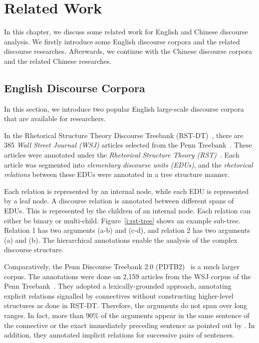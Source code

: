 %
%
%
\chapter{Related Work}
\label{c:related}

In this chapter, we discuss some related work for English and Chinese discourse
analysis. We firstly introduce some English discourse corpora and the
related discourse researches. Afterwards, we continue with the Chinese
discourse corpora and the related Chinese researches.

\section{English Discourse Corpora}

In this section, we introduce two popular English large-scale discourse
corpora that are available for researchers.

In the Rhetorical Structure Theory Discourse Treebank (RST-DT)~\citep{Carlson01building},
there are 385 \textit{Wall Street Journal (WSJ)} articles selected from
the Penn Treebank~\citep{marcus1993building}. These articles were annotated under
the \textit{Rhetorical Structure Theory (RST)}~\citep{mann-thompson88}.
Each article was segmented into \textit{elementary discourse units (EDUs)}, and the
\textit{rhetorical relations} between these EDUs were annotated in a tree structure
manner.

Each relation is represented by an internal node, while each EDU is represented
by a leaf node. A discourse relation is annotated between different spans of EDUs.
This is represented by the children of an internal node. Each relation can
either be binary or multi-child. Figure~\ref{i:rst-tree} shows an example sub-tree.
Relation 1 has two arguments (a-b) and (c-d), and relation 2 has two
arguments (a) and (b).
The hierarchical annotations enable the analysis of the complex discourse structure.



Comparatively, the Penn Discourse Treebank 2.0 (PDTB2)~\citep{Prasad08thepenn}
is a much larger corpus. The annotations were done on 2,159 articles from
the WSJ corpus of the Penn Treebank~\citep{marcus1993building}. They adopted a lexically-grounded
approach, annotating explicit relations signalled by connectives without constructing higher-level
structures as done in RST-DT. Therefore, the arguments do not span over long ranges. In fact,
more than 90\% of the arguments appear in the same sentence of the connective or the
exact immediately preceding sentence as pointed out by \cite{kong2014a}.
In addition, they annotated implicit relations for successive pairs of sentences.


